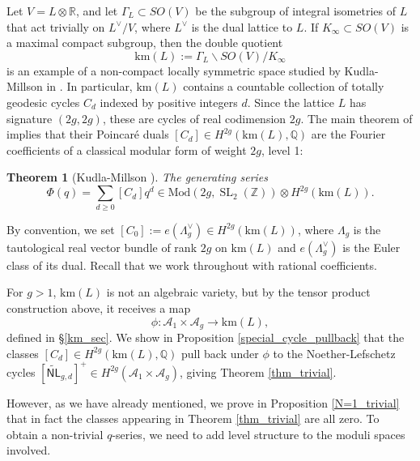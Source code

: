 \documentclass[12pt]{amsart}
\def\cA{\mathcal{A}}
\def\bQ{\mathbb{Q}}
\def\bR{\mathbb{R}}
\def\bZ{\mathbb{Z}}
\DeclareMathOperator{\SL}{SL}
\newcommand{\A}{\mathcal A}
\newcommand{\Mod}{\mathrm{Mod}}
\newcommand{\bs}{\backslash}
\newcommand{\wNL}{{\widetilde{\mathsf{NL}}}}
\newcommand{\km}{\mathrm{km}}
\newtheorem{thm}{Theorem}[section]
\theoremstyle{definition}
\begin{document}
Let $V=L\otimes \bR$, and let $\Gamma_L\subset SO(V)$ be the subgroup of integral isometries of $L$ that act trivially on $L^\vee/V$, where $L^\vee$ is the dual lattice to $L$. If $K_\infty\subset SO(V)$ is a maximal compact subgroup, then the double quotient
\begin{equation*}
\km(L) := \Gamma_L\bs SO(V)/K_\infty
\end{equation*}
is an example of a non-compact locally symmetric space studied by Kudla-Millson in \cite{km}. In particular, $\km(L)$ contains a countable collection of totally geodesic cycles $C_d$ indexed by positive integers $d$. Since the lattice $L$ has signature $(2g,2g)$, these are cycles of real codimension $2g$. The main theorem of \cite{km} implies that their Poincar\'{e} duals $[C_d]\in H^{2g}(\km(L),\bQ)$ are the Fourier coefficients of a classical modular form of weight $2g$, level 1:
\begin{thm}[Kudla-Millson \cite{km}]
The generating series
\begin{equation*}
  \Phi(q)=\sum_{d\geq 0} [C_d]q^d \in \Mod(2g, \SL_2(\bZ))\otimes H^{2g}(\km(L)).
\end{equation*}
\end{thm}
By convention, we set $[C_0]:=e(\Lambda_g^\vee)\in H^{2g}(\km(L))$, where $\Lambda_g$ is the tautological real vector bundle of rank $2g$ on $\km(L)$ and $e(\Lambda_g^\vee)$ is the Euler class of its dual. Recall that we work throughout with rational coefficients.

For $g>1$, $\km(L)$ is not an algebraic variety, but by the tensor product construction above, it receives a map
\begin{equation*}
\phi: \A_1\times \A_g \to \km(L),
\end{equation*}
defined in \S\ref{km_sec}. We show in Proposition \ref{special_cycle_pullback} that the classes $[C_d]\in H^{2g}(\km(L),\bQ)$ pull back under $\phi$ to the Noether-Lefschetz cycles $[\wNL_{g,d}]^+\in H^{2g}(\cA_1\times \cA_g)$, giving Theorem \ref{thm_trivial}.

However, as we have already mentioned, we prove in Proposition \ref{N=1_trivial} that in fact the classes appearing in Theorem \ref{thm_trivial} are all zero. To obtain a non-trivial $q$-series, we need to add level structure to the moduli spaces involved. 
\end{document}
